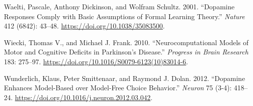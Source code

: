 \documentclass{article}
\newlength{\cslhangindent}
\newlength{\cslentryspacingunit} %
\newenvironment{CSLReferences}[2] %
 {%
  \setlength{\parindent}{0pt}
  \ifodd #1
  \let\oldpar\par
  \def\par{\hangindent=\cslhangindent\oldpar}
  \fi
  \setlength{\parskip}{#2\cslentryspacingunit}
 }%
 {}
\begin{document}
\begin{CSLReferences}{1}{0}
\leavevmode{}%
Waelti, Pascale, Anthony Dickinson, and Wolfram Schultz. 2001.
{``Dopamine Responses Comply with Basic Assumptions of Formal Learning
Theory.''} \emph{Nature} 412 (6842): 43--48.
\url{https://doi.org/10.1038/35083500}.

\leavevmode{}%
Wiecki, Thomas V., and Michael J. Frank. 2010. {``Neurocomputational
Models of Motor and Cognitive Deficits in {Parkinson}'s Disease.''}
\emph{Progress in Brain Research} 183: 275--97.
\url{https://doi.org/10.1016/S0079-6123(10)83014-6}.

\leavevmode{}%
Wunderlich, Klaus, Peter Smittenaar, and Raymond J. Dolan. 2012.
{``Dopamine {Enhances Model-Based} over {Model-Free Choice Behavior}.''}
\emph{Neuron} 75 (3-4): 418--24.
\url{https://doi.org/10.1016/j.neuron.2012.03.042}.

\end{CSLReferences}



\end{document}
